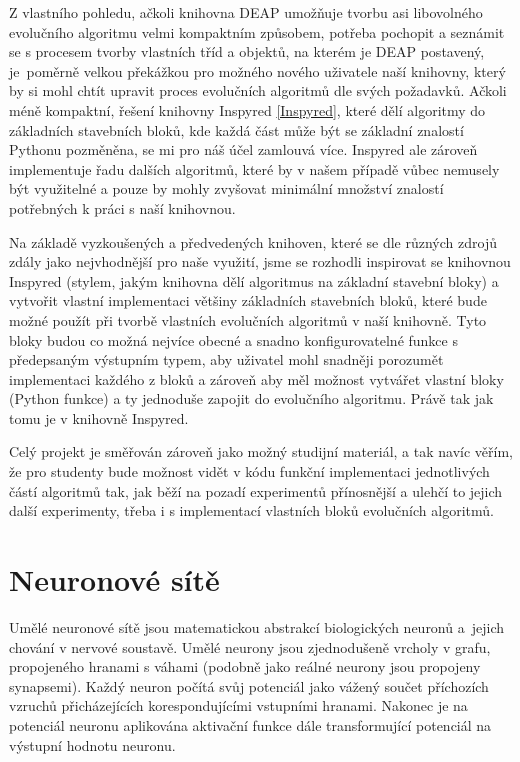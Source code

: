 Z vlastního pohledu, ačkoli knihovna DEAP umožňuje tvorbu asi
libovolného evolučního algoritmu velmi kompaktním způsobem, potřeba pochopit a
seznámit se s procesem tvorby vlastních tříd a objektů, na kterém je DEAP
postavený, je~poměrně velkou překážkou pro možného nového uživatele naší
knihovny, který by si mohl chtít upravit proces evolučních algoritmů dle
svých požadavků. Ačkoli méně kompaktní, řešení knihovny Inspyred
\ref{Inspyred}, které dělí algoritmy do základních stavebních bloků, kde každá
část může být se základní znalostí Pythonu pozměněna, se mi pro náš účel
zamlouvá více. Inspyred ale zároveň implementuje řadu dalších algoritmů, které
by v našem případě vůbec nemusely být využitelné a pouze by mohly zvyšovat
minimální množství znalostí potřebných k práci s naší knihovnou.

Na základě vyzkoušených a předvedených knihoven, které se dle různých zdrojů
\citep{fortin2012deap} zdály jako nejvhodnější pro naše využití, jsme se
rozhodli inspirovat se knihovnou Inspyred (stylem, jakým knihovna dělí
algoritmus na základní stavební bloky) a vytvořit vlastní implementaci většiny
základních stavebních bloků, které bude možné použít při tvorbě vlastních
evolučních algoritmů v naší knihovně. Tyto bloky budou co možná nejvíce obecné
a snadno konfigurovatelné funkce s předepsaným výstupním typem, aby uživatel
mohl snadněji porozumět implementaci každého z bloků a zároveň aby měl možnost
vytvářet vlastní bloky (Python funkce) a ty jednoduše zapojit do evolučního
algoritmu. Právě tak jak tomu je v knihovně Inspyred. 

Celý projekt je směřován zároveň jako možný studijní materiál, a tak navíc
věřím, že pro studenty bude možnost vidět v kódu funkční implementaci
jednotlivých částí algoritmů tak, jak běží na pozadí experimentů přínosnější a
ulehčí to jejich další experimenty, třeba i s implementací vlastních bloků
evolučních algoritmů.

\section{Neuronové sítě} \label{NN}
Umělé neuronové sítě jsou matematickou abstrakcí biologických neuronů a~jejich
chování v nervové soustavě. Umělé neurony jsou zjednodušeně vrcholy v grafu,
propojeného hranami s váhami (podobně jako reálné neurony jsou propojeny
synapsemi). Každý neuron počítá svůj potenciál jako vážený součet příchozích
vzruchů přicházejících korespondujícími vstupními hranami. Nakonec je
na potenciál neuronu aplikována aktivační funkce dále transformující
potenciál na výstupní hodnotu neuronu.

